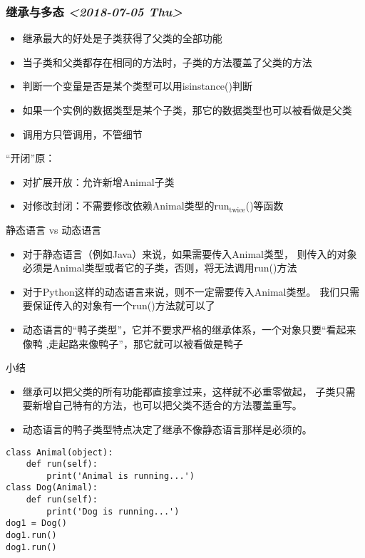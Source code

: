 \documentclass[11pt]{article}
\begin{document}
\subsubsection{继承与多态 \textit{<2018-07-05 Thu>}}
\label{sec:org5dbc53c}
\begin{itemize}
\item 继承最大的好处是子类获得了父类的全部功能
\item 当子类和父类都存在相同的方法时，子类的方法覆盖了父类的方法
\item 判断一个变量是否是某个类型可以用isinstance()判断
\item 如果一个实例的数据类型是某个子类，那它的数据类型也可以被看做是父类
\item 调用方只管调用，不管细节
\end{itemize}
“开闭”原：
\begin{itemize}
\item 对扩展开放：允许新增Animal子类
\item 对修改封闭：不需要修改依赖Animal类型的run\(_{\text{twice}}\)()等函数
\end{itemize}
静态语言 vs 动态语言
\begin{itemize}
\item 对于静态语言（例如Java）来说，如果需要传入Animal类型，
则传入的对象必须是Animal类型或者它的子类，否则，将无法调用run()方法
\item 对于Python这样的动态语言来说，则不一定需要传入Animal类型。
我们只需要保证传入的对象有一个run()方法就可以了
\item 动态语言的“鸭子类型”，它并不要求严格的继承体系，一个对象只要“看起来像鸭
,走起路来像鸭子”，那它就可以被看做是鸭子
\end{itemize}
小结
\begin{itemize}
\item 继承可以把父类的所有功能都直接拿过来，这样就不必重零做起，
子类只需要新增自己特有的方法，也可以把父类不适合的方法覆盖重写。
\item 动态语言的鸭子类型特点决定了继承不像静态语言那样是必须的。
\end{itemize}
\begin{verbatim}
class Animal(object):
    def run(self):
        print('Animal is running...')
class Dog(Animal):
    def run(self):
        print('Dog is running...')
dog1 = Dog()
dog1.run()
dog1.run()
\end{verbatim}
\end{document}
